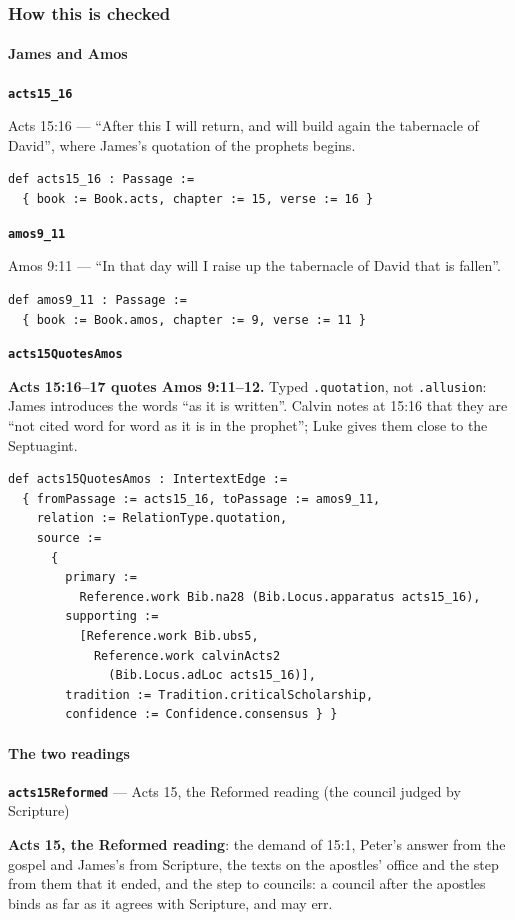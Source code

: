 \documentclass[11pt]{article}
\begin{document}
\subsubsection*{How this is checked}
\paragraph*{James and Amos}
\leavevmode\par\nobreak
\par\medskip\noindent\textbf{\texttt{acts15\_\allowbreak{}16}}\par\nobreak\noindent
Acts 15:16 — “After this I will return, and will build again the tabernacle of David”, where James’s quotation of the prophets begins.

{\small\begin{verbatim}
def acts15_16 : Passage :=
  { book := Book.acts, chapter := 15, verse := 16 }
\end{verbatim}}
\par\medskip\noindent\textbf{\texttt{amos9\_\allowbreak{}11}}\par\nobreak\noindent
Amos 9:11 — “In that day will I raise up the tabernacle of David that is fallen”.

{\small\begin{verbatim}
def amos9_11 : Passage :=
  { book := Book.amos, chapter := 9, verse := 11 }
\end{verbatim}}
\par\medskip\noindent\textbf{\texttt{acts15\allowbreak{}Quotes\allowbreak{}Amos}}\par\nobreak\noindent
\textbf{Acts 15:16–17 quotes Amos 9:11–12.} Typed \texttt{.quotation}, not \texttt{.allusion}: James introduces the words “as it is written”. Calvin notes at 15:16 that they are “not cited word for word as it is in the prophet”; Luke gives them close to the Septuagint.

{\small\begin{verbatim}
def acts15QuotesAmos : IntertextEdge :=
  { fromPassage := acts15_16, toPassage := amos9_11,
    relation := RelationType.quotation,
    source :=
      {
        primary :=
          Reference.work Bib.na28 (Bib.Locus.apparatus acts15_16),
        supporting :=
          [Reference.work Bib.ubs5,
            Reference.work calvinActs2
              (Bib.Locus.adLoc acts15_16)],
        tradition := Tradition.criticalScholarship,
        confidence := Confidence.consensus } }
\end{verbatim}}
\paragraph*{The two readings}
\leavevmode\par\nobreak
\par\medskip\noindent\textbf{\texttt{acts15\allowbreak{}Reformed}} --- Acts 15, the Reformed reading (the council judged by Scripture)\par\nobreak\noindent
\textbf{Acts 15, the Reformed reading}: the demand of 15:1, Peter’s answer from the gospel and James’s from Scripture, the texts on the apostles’ office and the step from them that it ended, and the step to councils: a council after the apostles binds as far as it agrees with Scripture, and may err.
\end{document}
